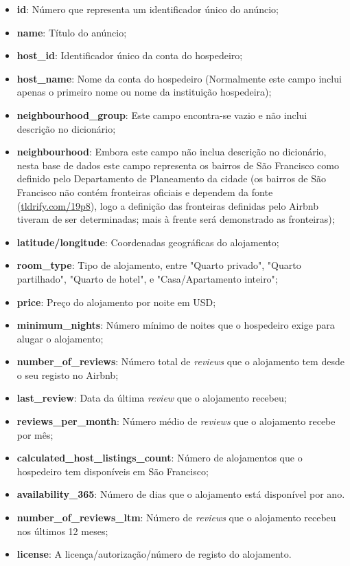 \documentclass[justified, 11pt]{scrartcl}\usepackage[]{graphicx}\usepackage[]{xcolor}
\begin{document}
\begin{itemize}
  \item \textbf{id}: Número que representa um identificador único do anúncio;
  \item \textbf{name}: Título do anúncio;
  \item \textbf{host\_id}: Identificador único da conta do hospedeiro;
  \item \textbf{host\_name}: Nome da conta do hospedeiro (Normalmente este campo inclui apenas o primeiro nome ou nome da instituição hospedeira);
  \item \textbf{neighbourhood\_group}: Este campo encontra-se vazio e não inclui descrição no dicionário;
  \item \textbf{neighbourhood}: Embora este campo não inclua descrição no dicionário, nesta base de dados este campo representa os bairros de São Francisco como definido pelo Departamento de Planeamento da cidade (os bairros de São Francisco não contém fronteiras oficiais e dependem da fonte (\url{tldrify.com/19p8}), logo a definição das fronteiras definidas pelo Airbnb tiveram de ser determinadas; mais à frente será demonstrado as fronteiras);
  \item \textbf{latitude/longitude}: Coordenadas geográficas do alojamento;
  \item \textbf{room\_type}: Tipo de alojamento, entre "Quarto privado", "Quarto partilhado", "Quarto de hotel", e "Casa/Apartamento inteiro";
  \item \textbf{price}: Preço do alojamento por noite em USD;
  \item \textbf{minimum\_nights}: Número mínimo de noites que o hospedeiro exige para alugar o alojamento;
  \item \textbf{number\_of\_reviews}: Número total de \textit{reviews} que o alojamento tem desde o seu registo no Airbnb;
  \item \textbf{last\_review}: Data da última \textit{review} que o alojamento recebeu;
  \item \textbf{reviews\_per\_month}: Número médio de \textit{reviews} que o alojamento recebe por mês;
  \item \textbf{calculated\_host\_listings\_count}: Número de alojamentos que o hospedeiro tem disponíveis em São Francisco;
  \item \textbf{availability\_365}: Número de dias que o alojamento está disponível por ano.
  \item \textbf{number\_of\_reviews\_ltm}: Número de \textit{reviews} que o alojamento recebeu nos últimos 12 meses;
  \item \textbf{license}: A licença/autorização/número de registo do alojamento.
\end{itemize}
\end{document}
